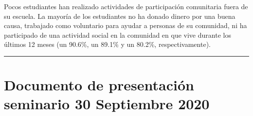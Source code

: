 \documentclass[
  14pt,
]{book}
\begin{document}
Pocos estudiantes han realizado actividades de participación comunitaria fuera de su escuela. La mayoría de los estudiantes no ha donado dinero por una buena causa, trabajado como voluntario para ayudar a personas de su comunidad, ni ha participado de una actividad social en la comunidad en que vive durante los últimos 12 meses (un 90.6\%, un 89.1\% y un 80.2\%, respectivamente).

\begin{center}\rule{0.5\linewidth}{0.5pt}\end{center}

\hypertarget{documento-de-presentaciuxf3n-seminario-30-septiembre-2020}{%
\chapter*{Documento de presentación seminario 30 Septiembre 2020}\label{documento-de-presentaciuxf3n-seminario-30-septiembre-2020}}

  
\end{document}
